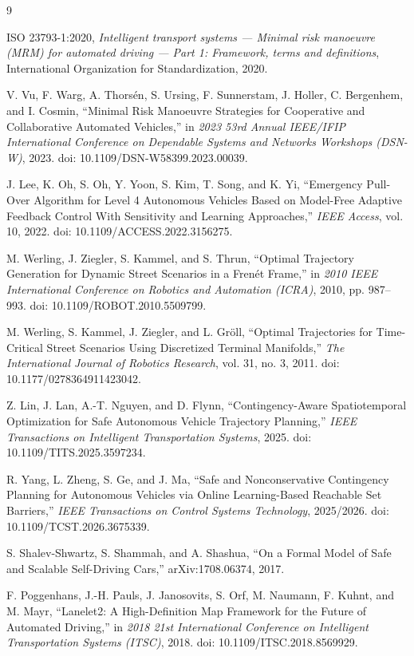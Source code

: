 \documentclass[11pt]{article}
\begin{document}
\begin{thebibliography}{9}

ISO 23793-1:2020,
\emph{Intelligent transport systems --- Minimal risk manoeuvre (MRM) for automated driving --- Part 1: Framework, terms and definitions},
International Organization for Standardization, 2020.

V. Vu, F. Warg, A. Thors\'en, S. Ursing, F. Sunnerstam, J. Holler, C. Bergenhem, and I. Cosmin,
``Minimal Risk Manoeuvre Strategies for Cooperative and Collaborative Automated Vehicles,''
in \emph{2023 53rd Annual IEEE/IFIP International Conference on Dependable Systems and Networks Workshops (DSN-W)}, 2023.
doi: 10.1109/DSN-W58399.2023.00039.

J. Lee, K. Oh, S. Oh, Y. Yoon, S. Kim, T. Song, and K. Yi,
``Emergency Pull-Over Algorithm for Level 4 Autonomous Vehicles Based on Model-Free Adaptive Feedback Control With Sensitivity and Learning Approaches,''
\emph{IEEE Access}, vol. 10, 2022.
doi: 10.1109/ACCESS.2022.3156275.

M. Werling, J. Ziegler, S. Kammel, and S. Thrun,
``Optimal Trajectory Generation for Dynamic Street Scenarios in a Fren\'et Frame,''
in \emph{2010 IEEE International Conference on Robotics and Automation (ICRA)}, 2010, pp. 987--993.
doi: 10.1109/ROBOT.2010.5509799.

M. Werling, S. Kammel, J. Ziegler, and L. Gr\"oll,
``Optimal Trajectories for Time-Critical Street Scenarios Using Discretized Terminal Manifolds,''
\emph{The International Journal of Robotics Research}, vol. 31, no. 3, 2011.
doi: 10.1177/0278364911423042.

Z. Lin, J. Lan, A.-T. Nguyen, and D. Flynn,
``Contingency-Aware Spatiotemporal Optimization for Safe Autonomous Vehicle Trajectory Planning,''
\emph{IEEE Transactions on Intelligent Transportation Systems}, 2025.
doi: 10.1109/TITS.2025.3597234.

R. Yang, L. Zheng, S. Ge, and J. Ma,
``Safe and Nonconservative Contingency Planning for Autonomous Vehicles via Online Learning-Based Reachable Set Barriers,''
\emph{IEEE Transactions on Control Systems Technology}, 2025/2026.
doi: 10.1109/TCST.2026.3675339.

S. Shalev-Shwartz, S. Shammah, and A. Shashua,
``On a Formal Model of Safe and Scalable Self-Driving Cars,''
arXiv:1708.06374, 2017.

F. Poggenhans, J.-H. Pauls, J. Janosovits, S. Orf, M. Naumann, F. Kuhnt, and M. Mayr,
``Lanelet2: A High-Definition Map Framework for the Future of Automated Driving,''
in \emph{2018 21st International Conference on Intelligent Transportation Systems (ITSC)}, 2018.
doi: 10.1109/ITSC.2018.8569929.

\end{thebibliography}
\end{document}
